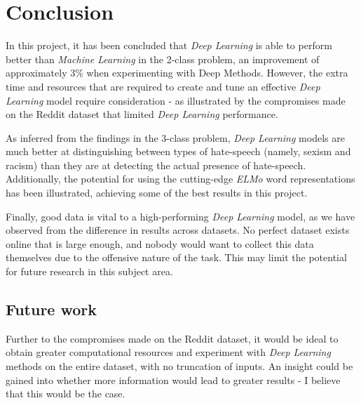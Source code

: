 \documentclass[12pt,a4paper]{article}
\begin{document}
\section{Conclusion}
In this project, it has been concluded that \textit{Deep Learning} is able to perform better than \textit{Machine Learning} in the 2-class problem, an improvement of approximately 3\% when experimenting with Deep Methods. However, the extra time and resources that are required to create and tune an effective \textit{Deep Learning} model require consideration - as illustrated by the compromises made on the Reddit dataset that limited \textit{Deep Learning} performance. 

As inferred from the findings in the 3-class problem, \textit{Deep Learning} models are much better at distinguishing between types of hate-speech (namely, sexism and racism) than they are at detecting the actual presence of hate-speech. Additionally, the potential for using the cutting-edge \textit{ELMo} word representations has been illustrated, achieving some of the best results in this project.

Finally, good data is vital to a high-performing \textit{Deep Learning} model, as we have observed from the difference in results across datasets. No perfect dataset exists online that is large enough, and nobody would want to collect this data themselves due to the offensive nature of the task. This may limit the potential for future research in this subject area.

\subsection{Future work}
Further to the compromises made on the Reddit dataset, it would be ideal to obtain greater computational resources and experiment with \textit{Deep Learning} methods on the entire dataset, with no truncation of inputs. An insight could be gained into whether more information would lead to greater results - I believe that this would be the case.
\end{document}
